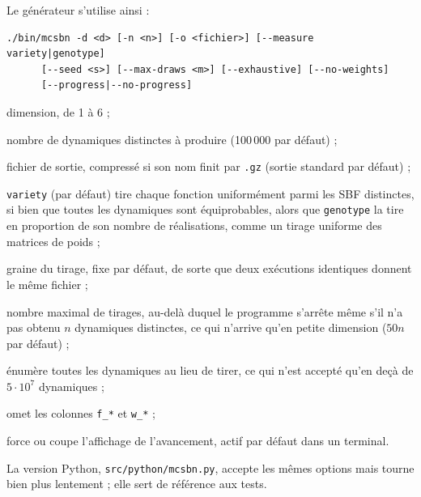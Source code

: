 Le générateur s'utilise ainsi :
{\small
\begin{verbatim}
./bin/mcsbn -d <d> [-n <n>] [-o <fichier>] [--measure variety|genotype]
      [--seed <s>] [--max-draws <m>] [--exhaustive] [--no-weights]
      [--progress|--no-progress]
\end{verbatim}
}
\begin{description}
\setlength{\itemsep}{0pt}
\item[\texttt{-d <d>}] dimension, de 1 à 6 ;
\item[\texttt{-n <n>}] nombre de dynamiques distinctes à produire (100\,000 par défaut) ;
\item[\texttt{-o <fichier>}] fichier de sortie, compressé si son nom finit par \texttt{.gz} (sortie standard par défaut) ;
\item[\texttt{-{}-measure}] \texttt{variety} (par défaut) tire chaque fonction uniformément parmi les SBF distinctes, si bien que toutes les dynamiques sont équiprobables, alors que \texttt{genotype} la tire en proportion de son nombre de réalisations, comme un tirage uniforme des matrices de poids ;
\item[\texttt{-{}-seed <s>}] graine du tirage, fixe par défaut, de sorte que deux exécutions identiques donnent le même fichier ;
\item[\texttt{-{}-max-draws <m>}] nombre maximal de tirages, au-delà duquel le programme s'arrête même s'il n'a pas obtenu $n$ dynamiques distinctes, ce qui n'arrive qu'en petite dimension ($50n$ par défaut) ;
\item[\texttt{-{}-exhaustive}] énumère toutes les dynamiques au lieu de tirer, ce qui n'est accepté qu'en deçà de $5\cdot 10^7$ dynamiques ;
\item[\texttt{-{}-no-weights}] omet les colonnes \texttt{f\_*} et \texttt{w\_*} ;
\item[\texttt{-{}-progress}, \texttt{-{}-no-progress}] force ou coupe l'affichage de l'avancement, actif par défaut dans un terminal.
\end{description}
La version Python, \texttt{src/python/mcsbn.py}, accepte les mêmes options mais tourne bien plus lentement ; elle sert de référence aux tests.

